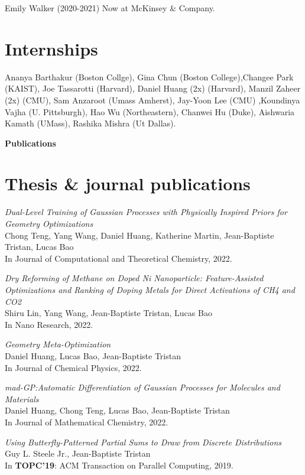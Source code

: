 \documentclass[margin,line]{res}
\begin{document}
\begin{resume}
Emily Walker (2020-2021) \hfill Now at McKinsey \& Company.

\section{\sc Internships}

Ananya Barthakur (Boston Collge), Gina Chun (Boston College),Changee
Park (KAIST), Joe Tassarotti (Harvard), Daniel Huang (2x) (Harvard),
Manzil Zaheer (2x) (CMU), Sam Anzaroot (Umass Amherst), Jay-Yoon Lee
(CMU) ,Koundinya Vajha (U. Pittsburgh), Hao Wu (Northeastern), Chanwei
Hu (Duke), Aishwaria Kamath (UMass), Rashika Mishra (Ut Dallas).

\newpage
  {\bf {\Large Publications}}

\section{\sc Thesis \& journal publications}

\emph{Dual-Level Training of Gaussian Processes with Physically Inspired Priors for Geometry Optimizations}\\
Chong Teng, Yang Wang, Daniel Huang, Katherine Martin, Jean-Baptiste Tristan, Lucas Bao\\
In Journal of Computational and Theoretical Chemistry, 2022.

\emph{Dry Reforming of Methane on Doped Ni Nanoparticle:
  Feature-Assisted Optimizations and Ranking of Doping Metals for
  Direct Activations of CH4 and CO2}\\
Shiru Lin, Yang Wang, Jean-Baptiste Tristan, Lucas Bao\\
In Nano Research, 2022.

\emph{Geometry Meta-Optimization}\\
Daniel Huang, Lucas Bao, Jean-Baptiste Tristan\\
In Journal of Chemical Physics, 2022.

\emph{mad-GP:Automatic Differentiation of Gaussian Processes for Molecules and Materials}\\
Daniel Huang, Chong Teng, Lucas Bao, Jean-Baptiste Tristan\\
In Journal of Mathematical Chemistry, 2022.

\emph{Using Butterfly-Patterned Partial Sums to Draw from Discrete Distributions}\\
Guy L. Steele Jr., Jean-Baptiste Tristan\\
In {\bf TOPC'19}: ACM Transaction on Parallel Computing, 2019.


\end{resume}
\end{document}
